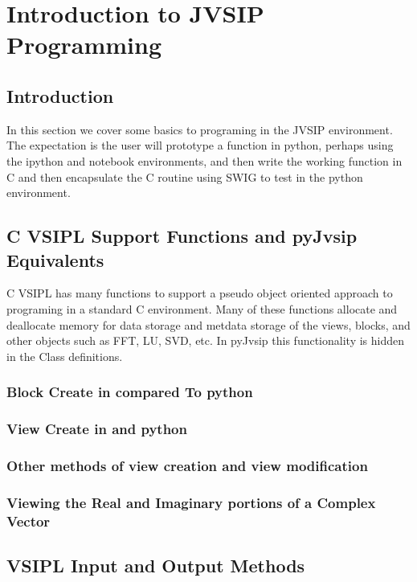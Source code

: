 \chapter{Introduction to JVSIP Programming}
\section*{Introduction}
In this section we cover some basics to programing in the JVSIP environment. The expectation is the user will prototype a function in python, perhaps using the ipython and notebook environments, and then write the working function in C and then encapsulate the C routine using SWIG to test in the python environment.
\section*{C VSIPL Support Functions and pyJvsip Equivalents}
C VSIPL has many functions to support a pseudo object oriented approach to programing in a standard C environment.  Many of these functions allocate and deallocate memory for data storage and metdata storage of the views, blocks, and other objects such as FFT, LU, SVD, etc.  In pyJvsip this functionality is hidden in the Class definitions.  
\subsection*{Block Create in \cvl{} compared To python  }
\subsection*{View Create in \cvl{} and python }
\subsection*{Other methods of view creation and view modification}
\subsection*{Viewing the Real and Imaginary portions of a Complex Vector}
\section*{VSIPL Input and Output Methods}
